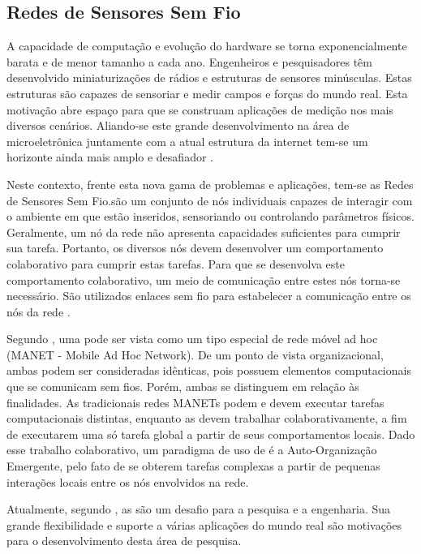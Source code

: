 \subsection{Redes de Sensores Sem Fio}

A capacidade de computação e evolução do hardware se torna exponencialmente barata e de menor tamanho a cada ano. Engenheiros e pesquisadores têm desenvolvido miniaturizações de rádios e estruturas de sensores minúsculas. Estas estruturas são capazes de sensoriar e medir campos e forças do mundo real. Esta motivação abre espaço para que se construam aplicações de medição nos mais diversos cenários. Aliando-se este grande desenvolvimento na área de microeletrônica juntamente com a atual estrutura da internet tem-se um horizonte ainda mais amplo e desafiador \cite{Culler2004}. 

Neste contexto, frente esta nova gama de problemas e aplicações, tem-se as Redes de Sensores Sem Fio.\wsn  são um conjunto de nós individuais capazes de interagir com o ambiente em que estão inseridos, sensoriando ou controlando parâmetros físicos.
Geralmente, um nó da rede não apresenta capacidades suficientes para cumprir sua tarefa. Portanto, os diversos nós devem desenvolver um comportamento colaborativo para cumprir estas tarefas. Para que se desenvolva este comportamento colaborativo, um meio de comunicação entre estes nós torna-se necessário. São utilizados enlaces sem fio para estabelecer a comunicação entre os nós da rede \cite{Holger2005}.


Segundo \cite{Loureiro}, uma \rssf pode ser vista como um tipo especial de rede móvel ad hoc (MANET - Mobile Ad Hoc Network). De um ponto de vista organizacional, ambas podem ser consideradas idênticas, pois possuem elementos computacionais que se comunicam sem fios. Porém, ambas se distinguem em relação às finalidades. As tradicionais redes MANETs podem e devem executar tarefas computacionais distintas, enquanto as \rssfs devem trabalhar colaborativamente, a fim de executarem uma só tarefa global a partir de seus comportamentos locais. Dado esse trabalho colaborativo, um paradigma de uso de \rssfs é a Auto-Organização Emergente, pelo fato de se obterem tarefas complexas a partir de pequenas interações locais entre os nós envolvidos na rede.

Atualmente, segundo \cite{Holger2005}, as \rssfs são um desafio para a pesquisa e a engenharia. Sua grande flexibilidade e suporte a várias aplicações do mundo real são motivações para o desenvolvimento desta área de pesquisa.


